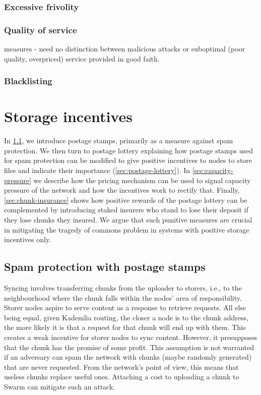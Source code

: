 \subsubsection{Excessive frivolity}

\subsubsection{Quality of service}

measures - need no distinction between malicious attacks or suboptimal (poor quality, overpriced) service provided in good faith.

\subsubsection{Blacklisting}

\section{Storage incentives}\label{sec:storage-incentives}


In \ref{sec:postage-stamps}, we introduce postage stamps, primarily as a measure against spam protection.  
We then turn to postage lottery explaining how postage stamps used for spam protection can be modified to give positive incentives to nodes to store files and indicate their importance (\ref{sec:postage-lottery}). In \ref{sec:capacity-pressure} we describe how the pricing mechanism can be used to signal capacity pressure of the network and how the incentives work to rectify that. Finally, \ref{sec:chunk-insurance} shows how positive rewards of the postage lottery can be complemented by introducing staked insurers who stand to lose their deposit if they lose chunks they insured. We argue that such punitive measures are crucial in mitigating the tragedy of commons problem in systems with positive storage incentives only. 

\subsection{Spam protection with postage stamps}\label{sec:postage-stamps}
\green{}

Syncing involves transferring chunks from the uploader to storers, i.e., to the neighbourhood where the chunk falls within the nodes' area of responsibility. Storer nodes aspire to serve content as a response to retrieve requests. All else being equal, given Kademlia routing, the closer a node is to the chunk address, the more likely it is that a request for that chunk will end up with them. This creates a weak incentive for storer nodes to sync content. However, it presupposes that the chunk has the promise of some profit. This assumption is not warranted if an adversary can spam the network with chunks (maybe randomly generated) that are never requested. From the network's point of view, this means that useless chunks replace useful ones. Attaching a cost to uploading a chunk to Swarm can mitigate such an attack. 


